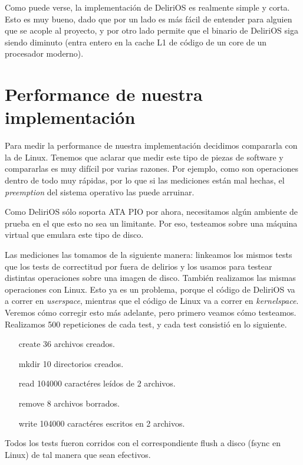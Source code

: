 Como puede verse, la implementación de DeliriOS es realmente simple y corta. Esto es muy bueno, dado que por un lado es más fácil de entender para alguien que se acople al proyecto, y por otro lado permite que el binario de DeliriOS siga siendo diminuto (entra entero en la cache L1 de código de un core de un procesador moderno).



\section{Performance de nuestra implementación}

Para medir la performance de nuestra implementación decidimos compararla con la de Linux.
Tenemos que aclarar que medir este tipo de piezas de software y compararlas es muy difícil por varias razones.
Por ejemplo, como son operaciones dentro de todo muy rápidas, por lo que si las mediciones están mal hechas, el \emph{preemption} del sistema operativo las puede arruinar.

Como DeliriOS sólo soporta ATA PIO por ahora, necesitamos algún ambiente de prueba en el que esto no sea un limitante. Por eso, testeamos sobre una máquina virtual que emulara este tipo de disco.

Las mediciones las tomamos de la siguiente manera: linkeamos los mismos tests que los tests de correctitud por fuera de delirios y los usamos para testear distintas operaciones sobre una imagen de disco.
Tambi\'en realizamos las mismas operaciones con Linux.
Esto ya es un problema, porque el código de DeliriOS va a correr en \emph{userspace}, mientras que el código de Linux va a correr en \emph{kernelspace}.
Veremos cómo corregir esto más adelante, pero primero veamos cómo testeamos. Realizamos 500 repeticiones de cada test, y cada test consistió en lo siguiente.

\begin{itemize}
    \item[create] 36 archivos creados.
    \item[mkdir] 10 directorios creados.
    \item[read] 104000 caract\'eres leídos de 2 archivos.
    \item[remove] 8 archivos borrados.
    \item[write] 104000 caract\'eres escritos en 2 archivos.
\end{itemize}

Todos los tests fueron corridos con el correspondiente flush a disco (fsync en Linux) de tal manera que sean efectivos.

